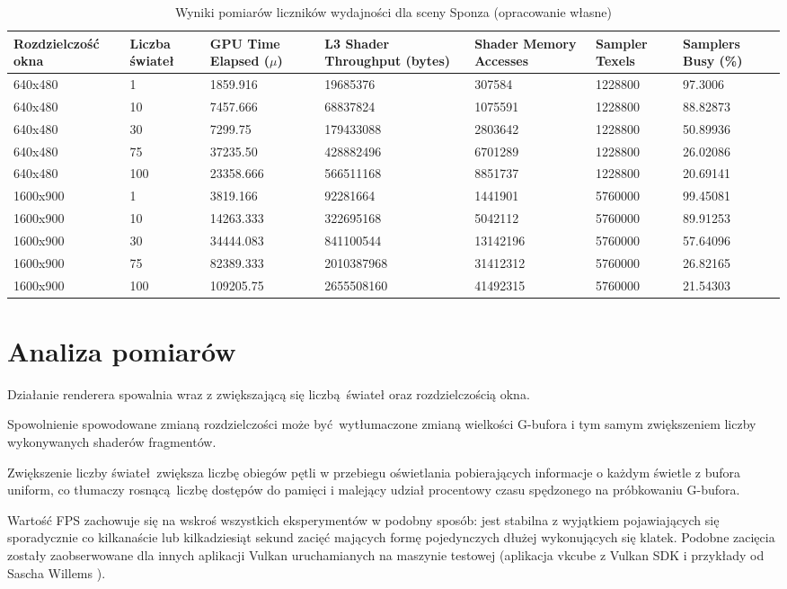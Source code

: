 \begin{table}[!ht]
	\centering
	\begin{tabular}{ |p{2cm}|p{1.1cm}||p{1.7cm}|p{1.8cm}|p{1.5cm}|p{1.3cm}|p{1.3cm}|}
		\hline
		Rozdzielczość okna & Liczba świateł & GPU Time Elapsed ($\mu$) & L3 Shader Throughput (bytes) & Shader Memory Accesses & Sampler Texels & Samplers Busy (\%) \\
		\hline \hline
		640x480 & 1 & 1859.916 & 19685376 & 307584 & 1228800 & 97.3006 \\
		\hline 
		640x480 & 10 & 7457.666 & 68837824 & 1075591 & 1228800 & 88.82873 \\
		\hline 
		640x480 & 30  & 7299.75 & 179433088 & 2803642 & 1228800 & 50.89936 \\
		\hline 
		640x480 & 75 & 37235.50 & 428882496 & 6701289 & 1228800 & 26.02086 \\
		\hline 
		640x480 & 100 & 23358.666 & 566511168 & 8851737 & 1228800 & 20.69141 \\
		\hline 	\hline 
		1600x900 & 1 & 3819.166 & 92281664 & 1441901 & 5760000 & 99.45081 \\
		\hline 
		1600x900 & 10 & 14263.333 & 322695168 & 5042112 & 5760000 & 89.91253 \\
		\hline 
		1600x900 & 30 & 34444.083 & 841100544 & 13142196 & 5760000 & 57.64096 \\
		\hline 
		1600x900 & 75 & 82389.333 & 2010387968 & 31412312 & 5760000 & 26.82165 \\
		\hline 
		1600x900 & 100 & 109205.75 & 2655508160 & 41492315 & 5760000 & 21.54303 \\
		\hline
	\end{tabular}
	\caption{Wyniki pomiarów liczników wydajności dla sceny Sponza (opracowanie własne)} 
	\label{results_sponza}
\end{table}


\section{Analiza pomiarów}

Działanie renderera spowalnia wraz z zwiększającą się liczbą świateł oraz rozdzielczością okna.

Spowolnienie spowodowane zmianą rozdzielczości może być wytłumaczone zmianą wielkości G-bufora i tym samym zwiększeniem liczby wykonywanych shaderów fragmentów.

Zwiększenie liczby świateł zwiększa liczbę obiegów pętli w przebiegu oświetlania pobierających informacje o każdym świetle z bufora uniform, co tłumaczy rosnącą liczbę dostępów do pamięci i malejący udział procentowy czasu spędzonego na próbkowaniu G-bufora.

Wartość FPS zachowuje się na wskroś wszystkich eksperymentów w podobny sposób: jest stabilna z wyjątkiem pojawiających się sporadycznie co kilkanaście lub kilkadziesiąt sekund zacięć mających formę pojedynczych dłużej wykonujących się klatek.
Podobne zacięcia zostały zaobserwowane dla innych aplikacji Vulkan uruchamianych na maszynie testowej (aplikacja vkcube z Vulkan SDK i przykłady od Sascha Willems \cite{SaschaWillems}).

